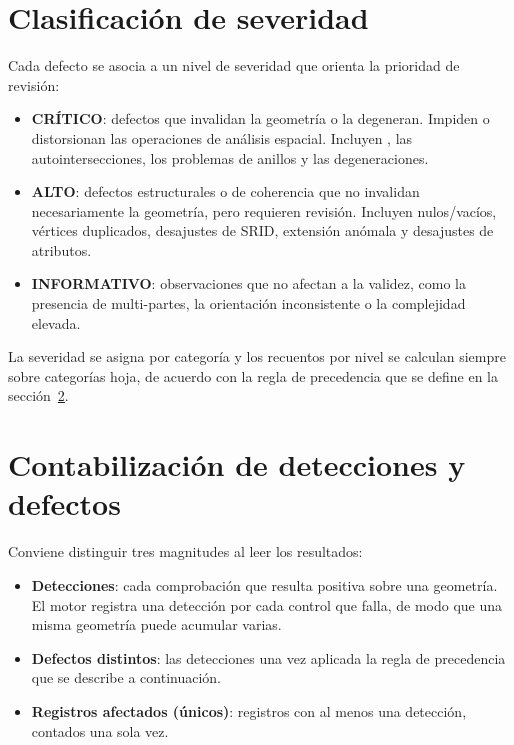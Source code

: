 \section{Clasificación de severidad}

Cada defecto se asocia a un nivel de severidad que orienta la prioridad de revisión:

\begin{itemize}[leftmargin=1.5em]
	\item \textbf{CRÍTICO}: defectos que invalidan la geometría o la degeneran. Impiden o distorsionan las operaciones de análisis espacial. Incluyen , las autointersecciones, los problemas de anillos y las degeneraciones.
	\item \textbf{ALTO}: defectos estructurales o de coherencia que no invalidan necesariamente la geometría, pero requieren revisión. Incluyen nulos/vacíos, vértices duplicados, desajustes de SRID, extensión anómala y desajustes de atributos.
	\item \textbf{INFORMATIVO}: observaciones que no afectan a la validez, como la presencia de multi-partes, la orientación inconsistente o la complejidad elevada.
\end{itemize}

La severidad se asigna por categoría y los recuentos por nivel se calculan siempre sobre categorías hoja, de acuerdo con la regla de precedencia que se define en la sección~\ref{sec:contabilizacion}.

\section{Contabilización de detecciones y defectos}
\label{sec:contabilizacion}

Conviene distinguir tres magnitudes al leer los resultados:

\begin{itemize}[leftmargin=1.5em]
	\item \textbf{Detecciones}: cada comprobación que resulta positiva sobre una geometría. El motor registra una detección por cada control que falla, de modo que una misma geometría puede acumular varias.
	\item \textbf{Defectos distintos}: las detecciones una vez aplicada la regla de precedencia que se describe a continuación.
	\item \textbf{Registros afectados (únicos)}: registros con al menos una detección, contados una sola vez.
\end{itemize}

